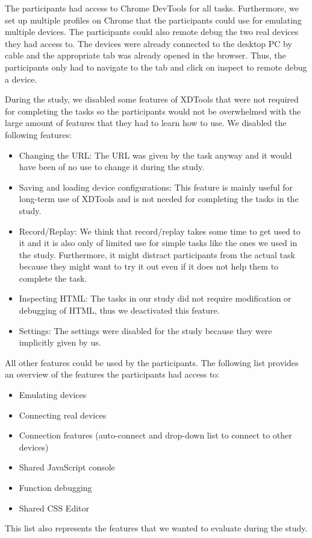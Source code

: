 The participants had access to Chrome DevTools for all tasks. Furthermore, we set up multiple profiles on Chrome that the participants could use for emulating multiple devices. The participants could also remote debug the two real devices they had access to. The devices were already connected to the desktop PC by cable and the appropriate tab was already opened in the browser. Thus, the participants only had to navigate to the tab and click on inspect to remote debug a device. 

During the study, we disabled some features of XDTools that were not required for completing the tasks so the participants would not be overwhelmed with the large amount of features that they had to learn how to use. We disabled the following features:
\begin{itemize}
	\item Changing the URL: The URL was given by the task anyway and it would have been of no use to change it during the study.
	\item Saving and loading device configurations: This feature is mainly useful for long-term use of XDTools and is not needed for completing the tasks in the study.
	\item Record/Replay: We think that record/replay takes some time to get used to it and it is also only of limited use for simple tasks like the ones we used in the study. Furthermore, it might distract participants from the actual task because they might want to try it out even if it does not help them to complete the task.
	\item Inspecting HTML: The tasks in our study did not require modification or debugging of HTML, thus we deactivated this feature.
	\item Settings: The settings were disabled for the study because they were implicitly given by us.
\end{itemize}

All other features could be used by the participants. The following list provides an overview of the features the participants had access to:
\begin{itemize}
	\item Emulating devices
	\item Connecting real devices
	\item Connection features (auto-connect and drop-down list to connect to other devices)
	\item Shared JavaScript console
	\item Function debugging
	\item Shared CSS Editor
\end{itemize}
This list also represents the features that we wanted to evaluate during the study.


